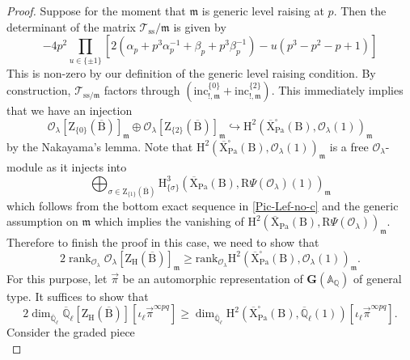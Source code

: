 \documentclass[10pt]{amsart}
\numberwithin{equation}{section}
\theoremstyle{definition}
\def\Pa{\mathrm{Pa}}
\DeclareMathOperator{\rank}{rank}
\def\calO{\mathcal{O}}
\def\calT{\mathcal{T}}
\def\fracm{\mathfrak{m}}
\def\bfG{\mathbf{G}}
\def\QQ{\mathbb{Q}}
\def\rmB{\mathrm{B}}
\def\rmH{\mathrm{H}}
\def\rmR{\mathrm{R}}
\def\rmX{\mathrm{X}}
\def\rmZ{\mathrm{Z}}
\begin{document}
\begin{proof}
Suppose for the moment that $\fracm$ is generic level raising at $p$. Then the determinant of the matrix $\calT_{\mathrm{ss}}/\fracm$ is given by 
\begin{equation*}
-4p^{2}\prod_{u\in \{\pm 1\}}[2(\alpha_{p}+p^{3}\alpha^{-1}_{p}+\beta_{p}+p^{3}\beta^{-1}_{p})-u(p^{3}-p^{2}-p+1)]
\end{equation*}
This is non-zero by our definition of the generic level raising condition. By construction, $\calT_{\mathrm{ss}/\fracm}$ factors through $(\mathrm{inc}^{\{0\}}_{!, \fracm}+\mathrm{inc}^{\{2\}}_{!, \fracm})$. This immediately implies that we have an injection
\begin{equation*}
\calO_{\lambda}[\rmZ_{\{0\}}(\overline{\rmB})]_{\fracm}\oplus\calO_{\lambda}[\rmZ_{\{2\}}(\overline{\rmB})]_{\fracm}\hookrightarrow \rmH^{2}(\overline{\rmX}^{\square}_{\Pa}(\rmB), \calO_{\lambda}(1))_{\fracm}
\end{equation*}
by the Nakayama's lemma. Note that $\rmH^{2}(\overline{\rmX}^{\square}_{\Pa}(\rmB), \calO_{\lambda}(1))_{\fracm}$ is a free $\calO_{\lambda}$-module as it injects into 
\begin{equation*}
\bigoplus_{\sigma\in\rmZ_{\{1\}}(\overline{\rmB})}\rmH^{3}_{\{\sigma\}}(\overline{\rmX}_{\Pa}(\rmB), \rmR\Psi(\calO_{\lambda})(1))_{\fracm}
\end{equation*}
which follows from the bottom exact sequence in \eqref{Pic-Lef-no-c} and the generic assumption on $\fracm$ which implies the vanishing of $\rmH^{2}(\overline{\rmX}_{\Pa}(\rmB), \rmR\Psi(\calO_{\lambda}))_{\fracm}$. Therefore to finish the proof in this case, we need to show that 
\begin{equation*}
2\rank_{\calO_{\lambda}} \calO_{\lambda}[\rmZ_{\rmH}(\overline{\rmB})]_{\fracm}\geq \mathrm{rank}_{\calO_{\lambda}}\rmH^{2}(\overline{\rmX}^{\square}_{\Pa}(\rmB), \calO_{\lambda}(1))_{\fracm}.
\end{equation*}
For this purpose, let $\vec{\pi}$ be an automorphic representation of $\bfG(\mathbb{A}_{\QQ})$ of general type. It suffices to show that
\begin{equation*}
2\dim_{\overline{\QQ}_{\ell}} \overline{\QQ}_{\ell}[\rmZ_{\rmH}(\overline{\rmB})][\iota_{\ell}\vec{\pi}^{\infty pq}]\geq \dim_{\overline{\QQ}_{\ell}}\rmH^{2}(\overline{\rmX}^{\square}_{\Pa}(\rmB), \overline{\QQ}_{\ell}(1))[\iota_{\ell}\vec{\pi}^{\infty pq}].
\end{equation*}
Consider the graded piece 
\begin{equation*}

\end{equation*}
\end{proof}
\end{document}
